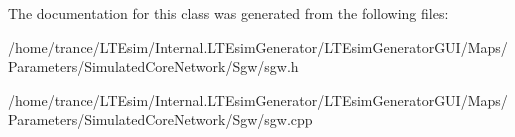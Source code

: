 The documentation for this class was generated from the following files\+:\begin{DoxyCompactItemize}
\item 
/home/trance/\+L\+T\+Esim/\+Internal.\+L\+T\+Esim\+Generator/\+L\+T\+Esim\+Generator\+G\+U\+I/\+Maps/\+Parameters/\+Simulated\+Core\+Network/\+Sgw/sgw.\+h\item 
/home/trance/\+L\+T\+Esim/\+Internal.\+L\+T\+Esim\+Generator/\+L\+T\+Esim\+Generator\+G\+U\+I/\+Maps/\+Parameters/\+Simulated\+Core\+Network/\+Sgw/sgw.\+cpp\end{DoxyCompactItemize}
